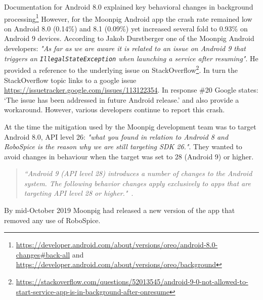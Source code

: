 Documentation for Android 8.0 explained key behavioral changes in background processing\footnote{\url{https://developer.android.com/about/versions/oreo/android-8.0-changes\#back-all} and \url{https://developer.android.com/about/versions/oreo/background}} However, for the Moonpig Android app the crash rate remained low on Android 8.0 (0.14\%) and 8.1 (0.09\%) yet increased several fold to 0.93\% on Android 9 devices. According to Jakob Durstberger one of the Moonpig Android developers: \textit{"As far as we are aware it is related to an issue on Android 9 that triggers an \texttt{IllegalStateException} when launching a service after resuming"}. He provided a reference to the underlying issue on StackOverflow\footnote{\url{https://stackoverflow.com/questions/52013545/android-9-0-not-allowed-to-start-service-app-is-in-background-after-onresume}}. In turn the StackOverflow topic links to a google issue \url{https://issuetracker.google.com/issues/113122354}. In response \#20 Google states: `The issue has been addressed in future Android release.' and also provide a workaround. However, various developers continue to report this crash. 

At the time the mitigation used by the Moonpig development team was to target Android 8.0, API level 26: \textit{"what you found in relation to Android 8 and RoboSpice is the reason why we are still targeting SDK 26."}. They wanted to avoid changes in behaviour when the target was set to 28 (Android 9) or higher.

\begin{quote}
    \emph{``Android 9 (API level 28) introduces a number of changes to the Android system. The following behavior changes apply exclusively to apps that are targeting API level 28 or higher."}~\citep{android_behavior_changes_apps_targeting_api_level_28plus}.
\end{quote}

By mid-October 2019 Moonpig had released a new version of the app that removed any use of RoboSpice. 

